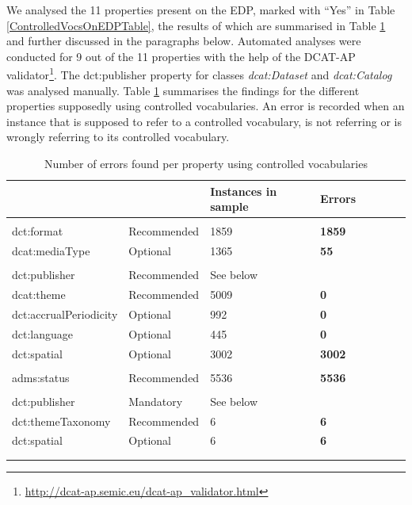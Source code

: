 \documentclass[<options>]{elsarticle}
\begin{document}
We analysed the 11 properties present on the EDP, marked with “Yes” in Table \ref{ControlledVocsOnEDPTable}, the results of which are summarised in Table \ref{ControlledVocsErrors} and further discussed in the paragraphs below. Automated analyses were conducted for 9 out of the 11 properties with the help of the DCAT-AP validator\footnote{\href{  http://dcat-ap.semic.eu/dcat-ap\_validator.html }{    http://dcat-ap.semic.eu/dcat-ap\_validator.html}}. The dct:publisher property for classes \textit{dcat:Dataset} and \textit{dcat:Catalog} was analysed manually. 
Table \ref{ControlledVocsErrors} summarises the findings for the different properties supposedly using controlled vocabularies. An error is recorded when an instance that is supposed to refer to a controlled vocabulary, is not referring or is wrongly referring to its controlled vocabulary.

\begin{longtable}{*8l}
\rowcolor{white!10}{\textbf{Property}} & {} & {\textbf{Instances in sample}} & {\textbf{Errors}} \\ \hline
\rowcolor{gray!10}{Distribution} & {} & {} & {} \\ \hline
\rowcolor{white!10} dct:format &Recommended &1859 &\textbf{1859} \\ \hline
\rowcolor{white!10} dcat:mediaType &Optional &1365 &\textbf{55} \\ \hline
\rowcolor{gray!10}{Dataset} & {} & {} & {} \\ \hline
\rowcolor{white!10} dct:publisher &Recommended &See below \\ \hline
\rowcolor{white!10} dcat:theme &Recommended &5009 &\textbf{0} \\ \hline
\rowcolor{white!10} dct:accrualPeriodicity &Optional &992 &\textbf{0} \\ \hline
\rowcolor{white!10} dct:language &Optional &445 &\textbf{0} \\ \hline
\rowcolor{white!10} dct:spatial &Optional &3002 &\textbf{3002} \\ \hline
\rowcolor{gray!10}{CatalogRecord} & {} & {} & {} \\ \hline
\rowcolor{white!10} adms:status &Recommended &5536 &\textbf{5536} \\ \hline
\rowcolor{gray!10}{Catalog} & {} & {} & {} \\ \hline
\rowcolor{white!10} dct:publisher &Mandatory &See below\\ \hline
\rowcolor{white!10} dct:themeTaxonomy &Recommended &6 &\textbf{6} \\ \hline
\rowcolor{white!10} dct:spatial &Optional &6 &\textbf{6} \\ \hline
\\
\caption{Number of errors found per property using controlled vocabularies }\label{ControlledVocsErrors}
\end{longtable}
\end{document}
